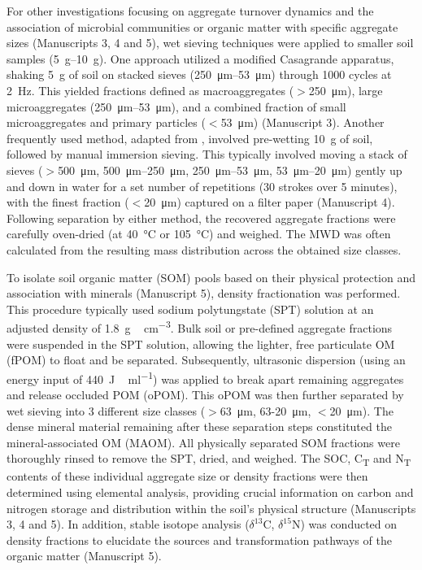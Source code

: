For other investigations focusing on aggregate turnover dynamics and the association of microbial communities or organic matter with specific aggregate sizes (Manuscripts 3, 4 and 5), wet sieving techniques were applied to smaller soil samples (\SIrange{5}{10}{\gram}). One approach utilized a modified Casagrande apparatus, shaking \SI{5}{\gram} of soil on stacked sieves (\SIrange{250}{53}{\micro\metre}) through 1000 cycles at \SI{2}{\hertz}. This yielded fractions defined as macroaggregates ($>$\SI{250}{\micro\metre}), large microaggregates (\SIrange[range-phrase=--,range-units=single]{250}{53}{\micro\metre}), and a combined fraction of small microaggregates and primary particles ($<$\SI{53}{\micro\metre}) (Manuscript 3). Another frequently used method, adapted from \citet{Elliott1986}, involved pre-wetting \SI{10}{\gram} of soil, followed by manual immersion sieving. This typically involved moving a stack of sieves ($>$\SI{500}{\micro\metre}, \SIrange[range-phrase=--]{500}{250}{\micro\metre}, \SIrange[range-phrase=--,range-units=single]{250}{53}{\micro\metre}, \SIrange[range-phrase=--,range-units=single]{53}{20}{\micro\metre}) gently up and down in water for a set number of repetitions (30 strokes over 5 minutes), with the finest fraction ($<$\SI{20}{\micro\metre}) captured on a filter paper (Manuscript 4). Following separation by either method, the recovered aggregate fractions were carefully oven-dried (at \SI{40}{\degreeCelsius} or \SI{105}{\degreeCelsius}) and weighed. The MWD was often calculated from the resulting mass distribution across the obtained size classes.

To isolate soil organic matter (SOM) pools based on their physical protection and association with minerals (Manuscript 5), density fractionation was performed. This procedure typically used sodium polytungstate (SPT) solution at an adjusted density of \SI{1.8}{\gram\,\centi\metre^{-3}}. Bulk soil or pre-defined aggregate fractions were suspended in the SPT solution, allowing the lighter, free particulate OM (fPOM) to float and be separated. Subsequently, ultrasonic dispersion (using an energy input of \SI{440}{\joule\,\milli\litre^{-1}}) was applied to break apart remaining aggregates and release occluded POM (oPOM). This oPOM was then further separated by wet sieving into 3 different size classes ($>$\SI{63}{\micro\metre}, 63-\SI{20}{\micro\metre}, $<$\SI{20}{\micro\metre}). The dense mineral material remaining after these separation steps constituted the mineral-associated OM (MAOM). All physically separated SOM fractions were thoroughly rinsed to remove the SPT, dried, and weighed. The SOC, C\textsubscript{T} and N\textsubscript{T} contents of these individual aggregate size or density fractions were then determined using elemental analysis, providing crucial information on carbon and nitrogen storage and distribution within the soil's physical structure (Manuscripts 3, 4 and 5). In addition, stable isotope analysis ($\delta^{13}\mathrm{C}$, $\delta^{15}\mathrm{N}$) was conducted on density fractions to elucidate the sources and transformation pathways of the organic matter (Manuscript 5).

